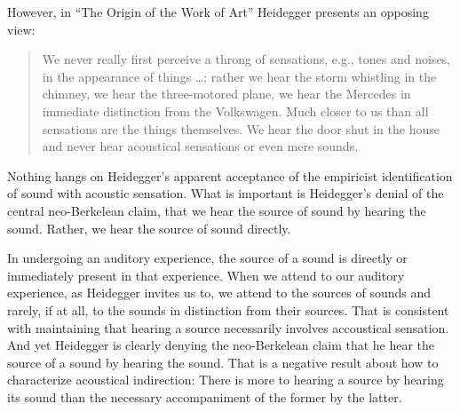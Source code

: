 However, in ``The Origin of the Work of Art'' Heidegger presents an opposing view:
\begin{quote}
    We never really first perceive a throng of sensations, e.g., tones and noises, in the appearance of things \ldots; rather we hear the storm whistling in the chimney, we hear the three-motored plane, we hear the Mercedes in immediate distinction from the Volkswagen. Much closer to us than all sensations are the things themselves. We hear the door shut in the house and never hear acoustical sensations or even mere sounds. \citep[151--152]{Heidegger:1935uq}
\end{quote}
Nothing hangs on Heidegger's apparent acceptance of the empiricist identification of sound with acoustic sensation. What is important is Heidegger's denial of the central neo-Berkelean claim, that we hear the source of sound by hearing the sound. Rather, we hear the source of sound directly.

In undergoing an auditory experience, the source of a sound is directly or immediately present in that experience. When we attend to our auditory experience, as Heidegger invites us to, we attend to the sources of sounds and rarely, if at all, to the sounds in distinction from their sources. That is consistent with maintaining that hearing a source necessarily involves accoustical sensation. And yet Heidegger is clearly denying the neo-Berkelean claim that he hear the source of a sound by hearing the sound. That is a negative result about how to characterize acoustical indirection: There is more to hearing a source by hearing its sound than the necessary accompaniment of the former by the latter.

